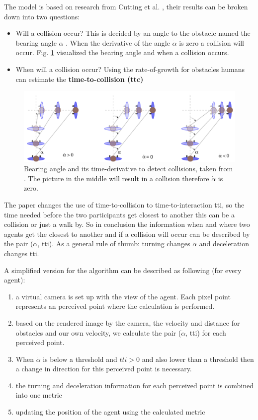 \documentclass{acmsiggraph}               %
\begin{document}
The model is based on research from Cutting et al.  , their results can be broken down into two questions: 
\begin{itemize}
\item Will a collision occur? This is decided by an angle to the obstacle named the bearing angle $\alpha$ . When the derivative of the angle \textbf{$\dot{\alpha}$} is zero a collision will occur. Fig. \ref{fig:visualBearingangle} visualized the bearing angle and when a collision occurs.
\item When will a collision occur? Using the rate-of-growth for obstacles humans can estimate the \textbf{time-to-collision (ttc)}
\end{itemize}
\begin{figure}[h]
  \centering
  \includegraphics[width=1\linewidth]{images/visualApproach-bearingAngle.png}
  \caption{Bearing angle and its time-derivative to detect collisions, taken from \protect\cite{ondrej_synthetic-vision_2010}. The picture in the middle will result in a collision therefore $\dot{\alpha}$ is zero.}
  \label{fig:visualBearingangle}
\end{figure}
The paper changes the use of time-to-collision to time-to-interaction tti, so the time needed before the two participants get closest to another this can be a collision or just a walk by. So in conclusion the information when and where two agents get the closest to another and if a collision will occur can be described by the pair ($\dot{\alpha}$, tti). As a general rule of thumb: turning changes $\dot{\alpha}$ and deceleration changes tti. 


 A simplified version for the algorithm can be described as following (for every agent):
\begin{enumerate}
    \item a virtual camera is set up with the view of the agent. Each pixel point represents an perceived point where the calculation is performed. 
    \item based on the rendered image by the camera, the velocity and distance for obstacles and our own velocity, we calculate the pair ($\dot{\alpha}$, tti) for each perceived point.
    \item When $\dot{\alpha}$ is below a threshold and $tti > 0$ and also lower than a threshold then a change in direction for this perceived point is necessary. 
    \item the turning and deceleration information for each perceived point is combined into one metric 
    \item updating the position of the agent using the calculated metric
\end{enumerate}
\end{document}
